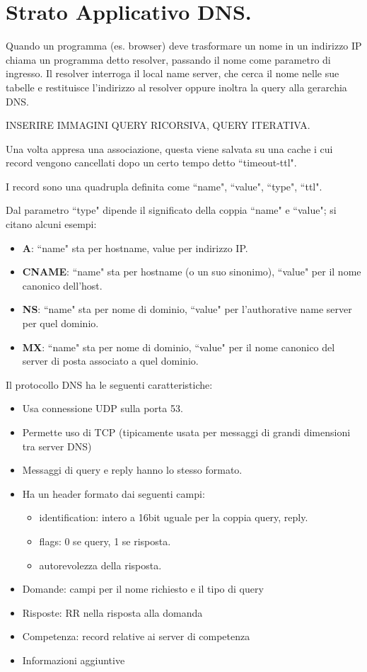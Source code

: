 \documentclass[11pt, italian, openany]{book}
\begin{document}
\begin{sloppypar}
\pagebreak

\section*{Strato Applicativo DNS.}

Quando un programma (es. browser) deve trasformare un nome in
un indirizzo IP chiama un programma detto resolver, passando il
nome come parametro di ingresso.
Il resolver interroga il local name server, che cerca il nome nelle sue
tabelle e restituisce l’indirizzo al resolver oppure inoltra la query
alla gerarchia DNS.

INSERIRE IMMAGINI QUERY RICORSIVA, QUERY ITERATIVA.

Una volta appresa una associazione, questa viene salvata su una cache i cui record vengono cancellati dopo un certo tempo detto ``timeout-ttl".

I record sono una quadrupla definita come ``name", ``value", ``type", ``ttl".

Dal parametro ``type" dipende il significato della coppia ``name" e ``value"; si citano alcuni esempi:
\begin{itemize}[topsep=0pt]
	\itemsep-0.3em
	\item \textbf{A}: ``name" sta per hostname, value per indirizzo IP.
	\item \textbf{CNAME}: ``name" sta per hostname (o un suo sinonimo), ``value" per il nome canonico dell'host.
	\item \textbf{NS}: ``name" sta per nome di dominio, ``value" per l'authorative name server per quel dominio.
	\item \textbf{MX}: ``name" sta per nome di dominio, ``value" per il nome canonico del server di posta associato a quel dominio.
\end{itemize}

Il protocollo DNS ha le seguenti caratteristiche:
\begin{itemize}[topsep=0pt]
	\itemsep-0.3em
	\item Usa connessione UDP sulla porta 53.
	\item Permette uso di TCP (tipicamente usata per messaggi di grandi dimensioni tra server DNS)
	\item Messaggi di query e reply hanno lo stesso formato.
	\item Ha un header formato dai seguenti campi:
	\vspace{-3.5mm}
	\begin{itemize}
		\itemsep-0.3em
		\item identification: intero a 16bit uguale per la coppia query, reply.
		\item flags: 0 se query, 1 se risposta.
		\item autorevolezza della risposta.
	\end{itemize}
	\item Domande: campi per il nome richiesto e il tipo di query
	\item Risposte: RR nella risposta alla domanda
	\item Competenza: record relative ai server di competenza
	\item Informazioni aggiuntive
\end{itemize}


\end{sloppypar}
\end{document}
